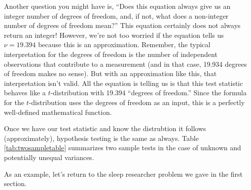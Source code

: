 Another question you might have is, ``Does this equation always give us an integer number of degrees of freedom, and, if not, what does a non-integer number of degrees of freedom mean?''  This equation certainly does not always return an integer!  However, we're not too worried if the equation tells us $\nu = 19.394$ because this is an approximation.  Remember, the typical interpretation for the degrees of freedom is the number of independent observations that contribute to a measurement (and in that case, 19.934 degrees of freedom makes no sense).  But with an approximation like this, that interpretation isn't valid.  All the equation is telling us is that this test statistic behaves like a $t$-distribution with 19.394 ``degrees of freedom.''  Since the formula for the $t$-distribution uses the degrees of freedom as an input, this is a perfectly well-defined mathematical function.

Once we have our test statistic and know the distrubtion it follows (approximately), hypothesis testing is the same as always.  Table \ref{tab:twosampletable} summarizes two sample tests in the case of unknown and potentially unequal variances.

\begin{table}[h] \label{tab:twosampletable}
\begin{center}
\end{center}
\end{table}

As an example, let's return to the sleep researcher problem we gave in the first section.


